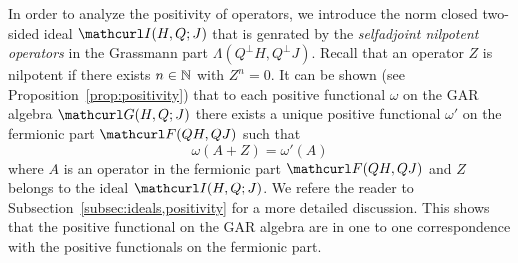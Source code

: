 \documentclass[pra,twoside,amsmath,amsfonts,amssymb,superscriptaddress,showpacs]{revtex4}
\def\7#1{{\Bbb #1}}
\def\9#1{{\mathcurl #1}}
\newcommand{\CAR}[2]{\9F(#1,#2)}
\newcommand{\GR}[2]{\Lambda(#1,#2)}
\newcommand{\GAR}[3]{\9G(#1,#3;#2)}
\newcommand{\IDL}[3]{\9I(#1,#3;#2)}
\begin{document}
In order to analyze the positivity of operators, we introduce the norm closed two-sided ideal
$\IDL{H}{J}{Q}$ that is genrated by the {\em selfadjoint nilpotent operators} in the
Grassmann part $\GR{Q^\perp H}{Q^\perp J}$. Recall that an operator $Z$ is nilpotent if there exists
$n\in\7N$ with $Z^n=0$. It can be shown (see Proposition~\ref{prop:positivity}) that to each
positive functional $\omega$ on the GAR algebra $\GAR{H}{J}{Q}$ there exists a unique
positive functional $\omega'$ on the fermionic part $\CAR{QH}{QJ}$ such that 
\begin{equation}
\omega(A+Z)=\omega'(A)
\end{equation}
where $A$ is an operator in the
fermionic part $\CAR{QH}{QJ}$ and $Z$ belongs to the ideal $\IDL{H}{J}{Q}$. We refere the reader to
Subsection~\ref{subsec:ideals,positivity} for a more detailed
discussion. This shows that the positive functional on the GAR algebra are in one to one
correspondence with
the positive functionals on the fermionic part. 
\end{document}

